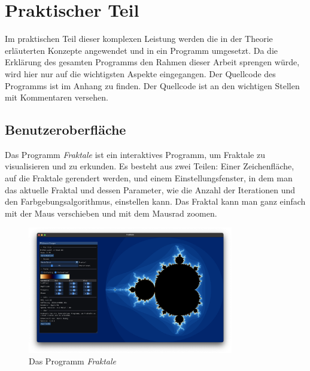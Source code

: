 \chapter{Praktischer Teil}
\thispagestyle{fancy} %
Im praktischen Teil dieser komplexen Leistung werden die in der Theorie erläuterten Konzepte angewendet und in ein Programm umgesetzt. \newline Da die Erklärung des gesamten Programms den Rahmen dieser Arbeit sprengen würde, wird hier nur auf die wichtigsten Aspekte eingegangen. Der Quellcode des Programms ist im Anhang zu finden. Der Quellcode ist an den wichtigen Stellen mit Kommentaren versehen.

\section{Benutzeroberfläche}
Das Programm \textit{Fraktale} ist ein interaktives Programm, um Fraktale zu
visualisieren und zu erkunden. \newline Es besteht aus zwei Teilen: Einer
Zeichenfläche, auf die Fraktale gerendert werden, und einem Einstellungsfenster,
in dem man das aktuelle Fraktal und dessen Parameter, wie die Anzahl der
Iterationen und den Farbgebungsalgorithmus, einstellen kann. Das Fraktal kann
man ganz einfach mit der Maus verschieben und mit dem Mausrad zoomen.

\begin{figure}[H]
    \centering
    \includegraphics[width=0.8\textwidth]{img/Programm.png}
    \caption{Das Programm \textit{Fraktale}}
\end{figure}

